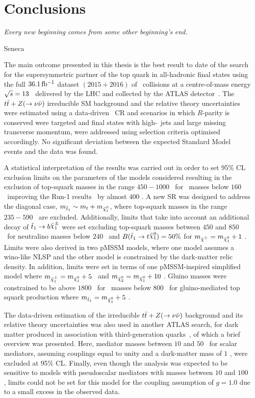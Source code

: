 \chapter*{Conclusions}
\epigraph{\emph{Every new beginning comes from some other beginning's end.}} {Seneca}


The main outcome presented in this thesis is the best result to date of the search for the supersymmetric partner of the top quark in all-hadronic final states using the full $36.1\, \mbox{fb$^{-1}$}$ dataset $(2015+2016)$ of \pp\ collisions at a centre-of-mass energy $\sqrt{s} = 13$ \TeV\ delivered by the \ac{LHC} and collected by the \ac{ATLAS} detector~\cite{stop0L}. The $t\bar{t}+Z (\rightarrow \nu \bar{\nu})$ irreducible \ac{SM} background and the relative theory uncertainties were estimated using a data-driven \ttgamma\ \ac{CR} and scenarios in which $R$-parity is conserved were targeted and final states with high-\pt\ jets and large missing transverse momentum, were addressed using selection criteria optimised accordingly. No significant deviation between the expected Standard Model events and the data was found.

A statistical interpretation of the results was carried out in order to set 95\% \ac{CL} exclusion limits on the parameters of the models considered resulting in the exclusion of top-squark masses in the range $450-1000$ \GeV\ for \ninoone\ masses below $160$ \GeV\ improving the Run-1 results~\cite{stop0LRun1} by almost $400$ \GeV. A new \ac{SR} was designed to address the diagonal case, $m_{\stopone} \sim m_t + m_{\ninoone}$, where top-squark masses in the range $235-590$ \GeV\ are excluded. Additionally, limits that take into account an additional decay of $\stopone \to b \chinoonepm$ were set excluding top-squark masses between $450$ and $850$ \GeV\ for neutralino masses below $240$ \GeV\ and $B(\stopone \to t \ninoone) = 50\%$ for $m_{\chinopm} = m_{\ninoone} + 1$ \GeV. Limits were also derived in two pMSSM models, where one model assumes a wino-like \ac{NLSP} and the other model is constrained by the dark-matter relic density. In addition, limits were set in terms of one \ac{pMSSM}-inspired simplified model where $m_{\chinoonepm} = m_{\ninoone} + 5$ \GeV\ and $m_{\ninotwo} = m_{\ninoone} + 10$ \GeV. Gluino masses were constrained to be above $1800$ \GeV\ for \stopone\ masses below $800$ \GeV\ for gluino-mediated top squark production where $m_{\stopone} = m_{\ninoone} + 5$ \GeV. 

The data-driven estimation of the irreducible $t\bar{t}+Z (\rightarrow \nu \bar{\nu})$ background and its relative theory uncertainties was also used in another ATLAS search, for dark matter produced in association with third-generation quarks~\cite{DMhf}, of which a brief overview was presented. Here, mediator masses between $10$ and $50$ \GeV\ for scalar mediators, assuming couplings equal to unity and a dark-matter mass of $1$ \GeV, were excluded at 95\% CL. Finally, even though the analysis was expected to be sensitive to models with pseudoscalar mediators with masses between $10$ and $100$ \GeV, limits could not be set for this model for the coupling assumption of $g = 1.0$ due to a small excess in the observed data.	
